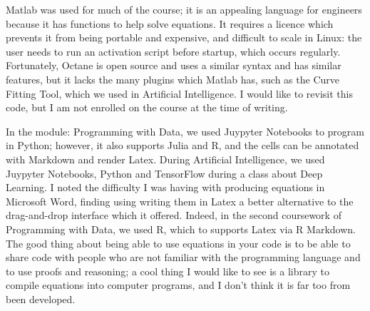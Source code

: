 \documentclass{article}
\begin{document}
Matlab was used for much of the course; it is an appealing language for engineers because it has functions to help solve equations. It requires a licence which prevents it from being portable and expensive, and difficult to scale in Linux: the user needs to run an activation script before startup, which occurs regularly. Fortunately, Octane is open source and uses a similar syntax and has similar features, but it lacks the many plugins which Matlab has, such as the Curve Fitting Tool, which we used in Artificial Intelligence. I would like to revisit this code, but I am not enrolled on the course at the time of writing.

In the module: Programming with Data, we used Juypyter Notebooks to program in Python; however, it also supports Julia and R, and the cells can be annotated with Markdown and render Latex. During Artificial Intelligence, we used Juypyter Notebooks, Python and TensorFlow during a class about Deep Learning. I noted the difficulty I was having with producing equations in Microsoft Word, finding using writing them in Latex a better alternative to the drag-and-drop interface which it offered. Indeed, in the second coursework of Programming with Data, we used  R, which to supports Latex via R Markdown. The good thing about being able to use equations in your code is to be able to share code with people who are not familiar with the programming language and to use proofs and reasoning; a cool thing I would like to see is a library to compile equations into computer programs, and I don't think it is far too from been developed.

\newpage

 
\end{document}
